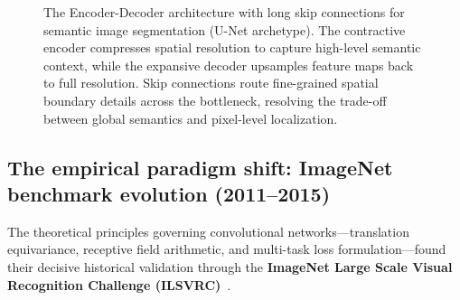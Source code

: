 \begin{figure}[H]
{%
}
\caption{The Encoder-Decoder architecture with long skip connections for semantic image segmentation (U-Net archetype). The contractive encoder compresses spatial resolution to capture high-level semantic context, while the expansive decoder upsamples feature maps back to full resolution. Skip connections route fine-grained spatial boundary details across the bottleneck, resolving the trade-off between global semantics and pixel-level localization.}
\label{fig:unet_architecture_schematic}
\end{figure}

\subsection{The empirical paradigm shift: ImageNet benchmark evolution (2011--2015)}
\label{sec:imagenet_benchmark_revolution}

The theoretical principles governing convolutional networks---translation equivariance, receptive field arithmetic, and multi-task loss formulation---found their decisive historical validation through the \textbf{ImageNet Large Scale Visual Recognition Challenge (ILSVRC)}~\cite{deng2009imagenet,russakovsky2015imagenet}.

